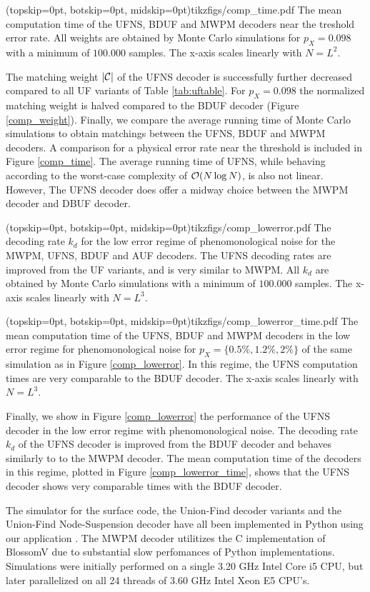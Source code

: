 \Figure[htb](topskip=0pt, botskip=0pt, midskip=0pt){tikzfigs/comp_time.pdf}{
  The mean computation time of the UFNS, BDUF and MWPM decoders near the treshold error rate. All weights are obtained by Monte Carlo simulations for $p_X=0.098$ with a minimum of $100.000$ samples. The x-axis scales linearly with $N = L^2$.\label{comp_time}}

The matching weight $\lvert\mathcal{C}\rvert$ of the UFNS decoder is successfully further decreased compared to all UF variants of Table \ref{tab:uftable}. For $p_X = 0.098$ the normalized matching weight is halved compared to the BDUF decoder (Figure \ref{comp_weight}). Finally, we compare the average running time of Monte Carlo simulations to obtain matchings between the UFNS, BDUF and MWPM decoders. A comparison for a physical error rate near the threshold is included in Figure \ref{comp_time}. The average running time of UFNS, while behaving according to the worst-case complexity of $\mathcal{O}(N \log{N})$, is also not linear. However, The UFNS decoder does offer a midway choice between the MWPM decoder and DBUF decoder. 

\Figure[htb](topskip=0pt, botskip=0pt, midskip=0pt){tikzfigs/comp_lowerror.pdf}{
  The decoding rate $k_d$ for the low error regime of phenomonological noise for the MWPM, UFNS, BDUF and AUF decoders. The UFNS decoding rates are improved from the UF variants, and is very similar to MWPM. All $k_d$ are obtained by Monte Carlo simulations with a minimum of $100.000$ samples. The x-axis scales linearly with $N = L^3$.\label{comp_lowerror}}

\Figure[htb](topskip=0pt, botskip=0pt, midskip=0pt){tikzfigs/comp_lowerror_time.pdf}{
  The mean computation time of the UFNS, BDUF and MWPM decoders in the low error regime for phenomonological noise for $p_X = \{0.5\%, 1.2\%, 2\%\}$ of the same simulation as in Figure \ref{comp_lowerror}. In this regime, the UFNS computation times are very comparable to the BDUF decoder. The x-axis scales linearly with $N = L^3$. \label{comp_lowerror_time}}

Finally, we show in Figure \ref{comp_lowerror} the performance of the UFNS decoder in the low error regime with phenomonological noise. The decoding rate $k_d$ of the UFNS decoder is improved from the BDUF decoder and behaves similarly to to the MWPM decoder. The mean computation time of the decoders in this regime, plotted in Figure \ref{comp_lowerror_time}, shows that the UFNS decoder shows very comparable times with the BDUF decoder.\par

The simulator for the surface code, the Union-Find decoder variants and the Union-Find Node-Suspension decoder have all been implemented in Python using our application \cite{OpenSurfaceSim}. The MWPM decoder utilitizes the C implementation of BlossomV \cite{kolmogorov2009blossom} due to substantial slow perfomances of Python implementations. Simulations were initially performed on a single 3.20 GHz Intel Core i5 CPU, but later parallelized on all 24 threads of 3.60 GHz Intel Xeon E5 CPU's. 